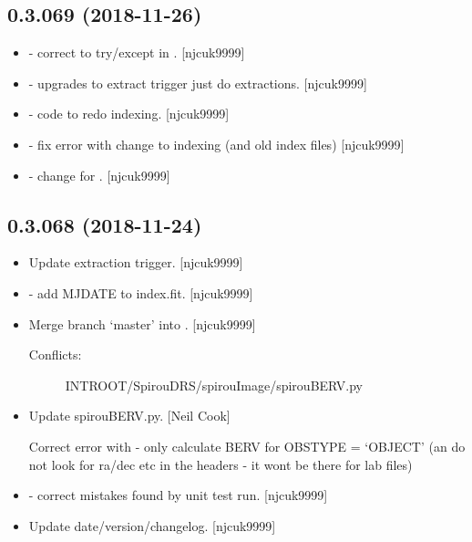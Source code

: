\documentclass[a4paper,10pt,english]{report}
\begin{document}
\subsection{0.3.069 (2018-11-26)}
\label{\detokenize{misc/changelog:id254}}\begin{itemize}
\item {} 
 - correct to try/except in .
{[}njcuk9999{]}

\item {} 
 - upgrades to extract trigger just do extractions.
{[}njcuk9999{]}

\item {} 
 - code to redo indexing. {[}njcuk9999{]}

\item {} 
 - fix error with change to indexing (and old index
files) {[}njcuk9999{]}

\item {} 
 - change  for .
{[}njcuk9999{]}

\end{itemize}


\subsection{0.3.068 (2018-11-24)}
\label{\detokenize{misc/changelog:id255}}\begin{itemize}
\item {} 
Update extraction trigger. {[}njcuk9999{]}

\item {} 
 - add MJDATE to index.fit. {[}njcuk9999{]}

\item {} 
Merge branch ‘master’ into . {[}njcuk9999{]}
\begin{description}
\item[{Conflicts:}] \leavevmode
INTROOT/SpirouDRS/spirouImage/spirouBERV.py

\end{description}

\item {} 
Update spirouBERV.py. {[}Neil Cook{]}

Correct error with  - only calculate BERV for OBSTYPE = ‘OBJECT’ (an do not look for ra/dec etc in the headers - it wont be there for lab files)

\item {} 
 - correct mistakes found by unit test run.
{[}njcuk9999{]}

\item {} 
Update date/version/changelog. {[}njcuk9999{]}

\end{itemize}
\end{document}
